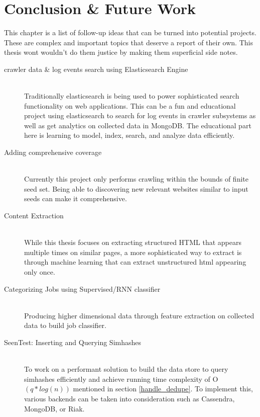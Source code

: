 \chapter{Conclusion \& Future Work}
This chapter is a list of follow-up ideas that can be turned into potential projects. These are complex and
important topics that deserve a report of their own. This thesis wont wouldn't do them justice by making
them superficial side notes.

\begin{description}
  \item[crawler data \& log events search using Elasticsearch Engine] \hfill \\
    Traditionally elasticsearch is being used to power sophisticated search functionality on web
    applications. This can be a fun and educational project using elasticsearch to search for log
    events in crawler subsystems as well as get analytics on collected data in MongoDB. The educational
    part here is learning to model, index, search, and analyze data efficiently.
  \item[Adding comprehensive coverage] \hfill \\
    Currently this project only performs crawling within the bounds of finite seed set. Being able to
    discovering new relevant websites similar to input seeds can make it comprehensive.
  \item[Content Extraction] \hfill \\
    While this thesis focuses on extracting structured HTML that appears multiple times on similar pages,
    a more sophisticated way to extract is through machine learning that can extract unstructured html
    \cite{contentExtract} appearing only once.
  \item[Categorizing Jobs using Supervised/RNN classifier] \hfill \\
    Producing higher dimensional data through feature extraction on collected data to build job
    classifier.
  \item[SeenTest: Inserting and Querying Simhashes] \hfill \\
    To work on a performant solution to build the data store to query simhashes efficiently and achieve
    running time complexity of O$(q * log(n))$ mentioned in section \ref{handle_dedupe}. To implement
    this, various backends can be taken into consideration such as Cassendra, MongoDB, or Riak.
    
\end{description}

\pagebreak